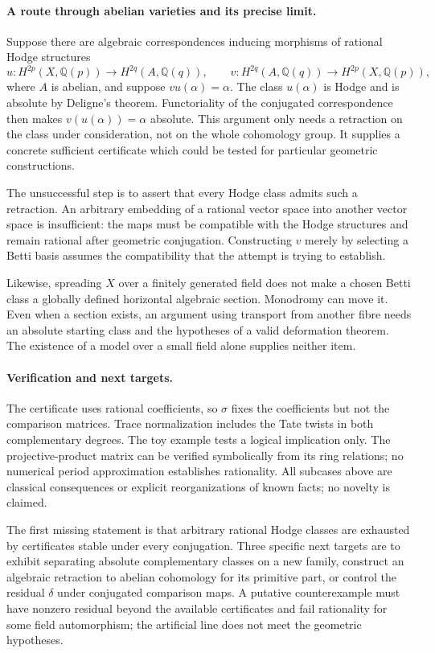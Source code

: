 \documentclass[11pt]{article}
\begin{document}
\paragraph{A route through abelian varieties and its precise limit.}
Suppose there are algebraic correspondences inducing morphisms of
rational Hodge structures
\[
 u:H^{2p}(X,\mathbb Q(p))\longrightarrow H^{2q}(A,\mathbb Q(q)),
 \qquad
 v:H^{2q}(A,\mathbb Q(q))\longrightarrow H^{2p}(X,\mathbb Q(p)),
\]
where $A$ is abelian, and suppose $v u(\alpha)=\alpha$.
The class $u(\alpha)$ is Hodge and is absolute by Deligne's theorem.
Functoriality of the conjugated correspondence then makes
$v(u(\alpha))=\alpha$ absolute. This argument only needs a retraction
on the class under consideration, not on the whole cohomology group.
It supplies a concrete sufficient certificate which could be tested
for particular geometric constructions.

The unsuccessful step is to assert that every Hodge class admits such
a retraction. An arbitrary embedding of a rational vector space into
another vector space is insufficient: the maps must be compatible
with the Hodge structures and remain rational after geometric
conjugation. Constructing $v$ merely by selecting a Betti basis assumes
the compatibility that the attempt is trying to establish.

Likewise, spreading $X$ over a finitely generated field does not make a
chosen Betti class a globally defined horizontal algebraic section.
Monodromy can move it. Even when a section exists, an argument using
transport from another fibre needs an absolute starting class and the
hypotheses of a valid deformation theorem. The existence of a model
over a small field alone supplies neither item.

\paragraph{Verification and next targets.}
The certificate uses rational coefficients, so $\sigma$ fixes the
coefficients but not the comparison matrices. Trace normalization
includes the Tate twists in both complementary degrees. The toy
example tests a logical implication only. The projective-product
matrix can be verified symbolically from its ring relations; no
numerical period approximation establishes rationality. All subcases
above are classical consequences or explicit reorganizations of
known facts; no novelty is claimed.

The first missing statement is that arbitrary rational Hodge classes
are exhausted by certificates stable under every conjugation. Three
specific next targets are to exhibit separating absolute complementary
classes on a new family, construct an algebraic retraction to abelian
cohomology for its primitive part, or control the residual $\delta$
under conjugated comparison maps. A putative counterexample must have
nonzero residual beyond the available certificates and fail rationality
for some field automorphism; the artificial line does not meet the
geometric hypotheses.
\end{document}

